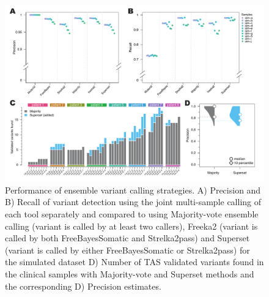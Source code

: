 \begin{figure}[!ht]
\centering
  \includegraphics[width=\textwidth]{Appendices/Variantcalling/supp/S11}
  \caption[Performance of ensemble variant calling strategies]{Performance of ensemble variant calling strategies. A) Precision and B) Recall of variant detection using the joint multi-sample calling of each tool separately and compared to using Majority-vote ensemble calling (variant is called by at least two callers), Freeka2 (variant is called by both FreeBayesSomatic and Strelka2pass) and Superset (variant is called by either FreeBayesSomatic or Strelka2pass) for the simulated dataset D) Number of TAS validated variants found in the clinical samples with Majority-vote and Superset methods and the corresponding D) Precision estimates.}\label{A:fig:S11}
\end{figure}


